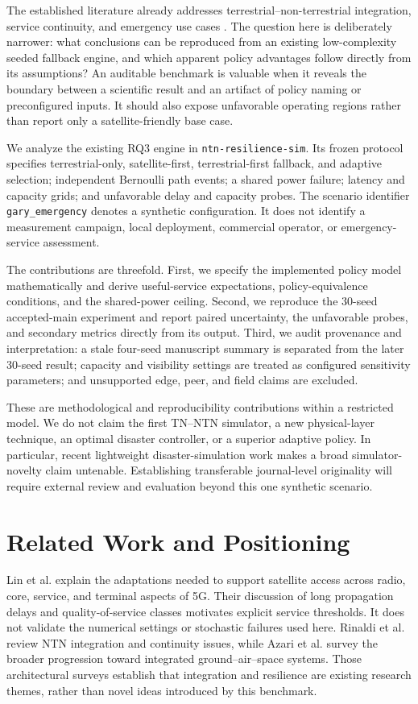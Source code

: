 \documentclass{IEEEoj}
\begin{document}
The established literature already addresses terrestrial--non-terrestrial integration, service continuity, and emergency use cases \cite{lin2021,rinaldi2020,azari2022}. The question here is deliberately narrower: what conclusions can be reproduced from an existing low-complexity seeded fallback engine, and which apparent policy advantages follow directly from its assumptions? An auditable benchmark is valuable when it reveals the boundary between a scientific result and an artifact of policy naming or preconfigured inputs. It should also expose unfavorable operating regions rather than report only a satellite-friendly base case.

We analyze the existing RQ3 engine in \texttt{ntn-resilience-sim}. Its frozen protocol specifies terrestrial-only, satellite-first, terrestrial-first fallback, and adaptive selection; independent Bernoulli path events; a shared power failure; latency and capacity grids; and unfavorable delay and capacity probes. The scenario identifier \texttt{gary\_emergency} denotes a synthetic configuration. It does not identify a measurement campaign, local deployment, commercial operator, or emergency-service assessment.

The contributions are threefold. First, we specify the implemented policy model mathematically and derive useful-service expectations, policy-equivalence conditions, and the shared-power ceiling. Second, we reproduce the 30-seed accepted-main experiment and report paired uncertainty, the unfavorable probes, and secondary metrics directly from its output. Third, we audit provenance and interpretation: a stale four-seed manuscript summary is separated from the later 30-seed result; capacity and visibility settings are treated as configured sensitivity parameters; and unsupported edge, peer, and field claims are excluded.

These are methodological and reproducibility contributions within a restricted model. We do not claim the first TN--NTN simulator, a new physical-layer technique, an optimal disaster controller, or a superior adaptive policy. In particular, recent lightweight disaster-simulation work \cite{wang2026} makes a broad simulator-novelty claim untenable. Establishing transferable journal-level originality will require external review and evaluation beyond this one synthetic scenario.

\section{Related Work and Positioning}
Lin et al. \cite{lin2021} explain the adaptations needed to support satellite access across radio, core, service, and terminal aspects of 5G. Their discussion of long propagation delays and quality-of-service classes motivates explicit service thresholds. It does not validate the numerical settings or stochastic failures used here. Rinaldi et al. \cite{rinaldi2020} review NTN integration and continuity issues, while Azari et al. \cite{azari2022} survey the broader progression toward integrated ground--air--space systems. Those architectural surveys establish that integration and resilience are existing research themes, rather than novel ideas introduced by this benchmark.
\end{document}
